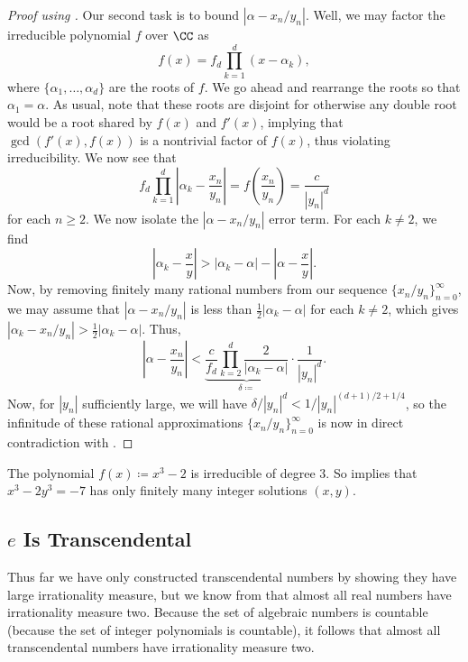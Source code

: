 \documentclass[../notes.tex]{subfiles}
\begin{document}
\begin{proof}[Proof using ]
	Our second task is to bound $\left|\alpha-x_n/y_n\right|$. Well, we may factor the irreducible polynomial $f$ over $\CC$ as
	\[f(x)=f_d\prod_{k=1}^d(x-\alpha_k),\]
	where $\{\alpha_1,\ldots,\alpha_d\}$ are the roots of $f$. We go ahead and rearrange the roots so that $\alpha_1=\alpha$. As usual, note that these roots are disjoint for otherwise any double root would be a root shared by $f(x)$ and $f'(x)$, implying that $\gcd(f'(x),f(x))$ is a nontrivial factor of $f(x)$, thus violating irreducibility. We now see that
	\[f_d\prod_{k=1}^d\left|\alpha_k-\frac{x_n}{y_n}\right|=f\left(\frac{x_n}{y_n}\right)=\frac c{\left|y_n\right|^d}\]
	for each $n\ge2$. We now isolate the $\left|\alpha-x_n/y_n\right|$ error term. For each $k\ne2$, we find
	\[\left|\alpha_k-\frac xy\right|>\left|\alpha_k-\alpha\right|-\left|\alpha-\frac xy\right|.\]
	Now, by removing finitely many rational numbers from our sequence $\{x_n/y_n\}_{n=0}^\infty$, we may assume that $\left|\alpha-x_n/y_n\right|$ is less than $\frac12\left|\alpha_k-\alpha\right|$ for each $k\ne2$, which gives $\left|\alpha_k-x_n/y_n\right|>\frac12\left|\alpha_k-\alpha\right|$. Thus,
	\[\left|\alpha-\frac{x_n}{y_n}\right|<\underbrace{\frac c{f_d}\prod_{k=2}^d\frac2{\left|\alpha_k-\alpha\right|}}_{\delta\coloneqq}\cdot\frac1{\left|y_n\right|^d}.\]
	Now, for $\left|y_n\right|$ sufficiently large, we will have $\delta/\left|y_n\right|^d<1/\left|y_n\right|^{(d+1)/2+1/4}$, so the infinitude of these rational approximations $\{x_n/y_n\}_{n=0}^\infty$ is now in direct contradiction with .
\end{proof}
\begin{example}
	The polynomial $f(x)\coloneqq x^3-2$ is irreducible of degree $3$. So  implies that $x^3-2y^3=-7$ has only finitely many integer solutions $(x,y)$.
\end{example}

\subsection{\texorpdfstring{$e$}{e} Is Transcendental}
Thus far we have only constructed transcendental numbers by showing they have large irrationality measure, but we know from  that almost all real numbers have irrationality measure two. Because the set of algebraic numbers is countable (because the set of integer polynomials is countable), it follows that almost all transcendental numbers have irrationality measure two.
\end{document}
